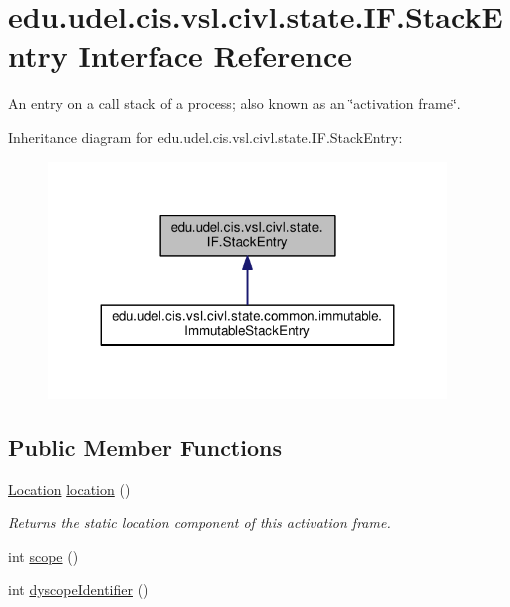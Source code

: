 \hypertarget{interfaceedu_1_1udel_1_1cis_1_1vsl_1_1civl_1_1state_1_1IF_1_1StackEntry}{}\section{edu.\+udel.\+cis.\+vsl.\+civl.\+state.\+I\+F.\+Stack\+Entry Interface Reference}
\label{interfaceedu_1_1udel_1_1cis_1_1vsl_1_1civl_1_1state_1_1IF_1_1StackEntry}


An entry on a call stack of a process; also known as an \char`\"{}activation frame\char`\"{}.  




Inheritance diagram for edu.\+udel.\+cis.\+vsl.\+civl.\+state.\+I\+F.\+Stack\+Entry\+:
\nopagebreak
\begin{figure}[H]
\begin{center}
\leavevmode
\includegraphics[width=299pt]{interfaceedu_1_1udel_1_1cis_1_1vsl_1_1civl_1_1state_1_1IF_1_1StackEntry__inherit__graph}
\end{center}
\end{figure}
\subsection*{Public Member Functions}
\begin{DoxyCompactItemize}
\item 
\hyperlink{interfaceedu_1_1udel_1_1cis_1_1vsl_1_1civl_1_1model_1_1IF_1_1location_1_1Location}{Location} \hyperlink{interfaceedu_1_1udel_1_1cis_1_1vsl_1_1civl_1_1state_1_1IF_1_1StackEntry_a02cfe9422f4c36e31fe124277418d27c}{location} ()
\begin{DoxyCompactList}\small\item\em Returns the static location component of this activation frame. \end{DoxyCompactList}\item 
int \hyperlink{interfaceedu_1_1udel_1_1cis_1_1vsl_1_1civl_1_1state_1_1IF_1_1StackEntry_a206f3a162926cf97ab36c6a582edce10}{scope} ()
\item 
int \hyperlink{interfaceedu_1_1udel_1_1cis_1_1vsl_1_1civl_1_1state_1_1IF_1_1StackEntry_af4da402336bd0c3164a9342f94996254}{dyscope\+Identifier} ()
\end{DoxyCompactItemize}


